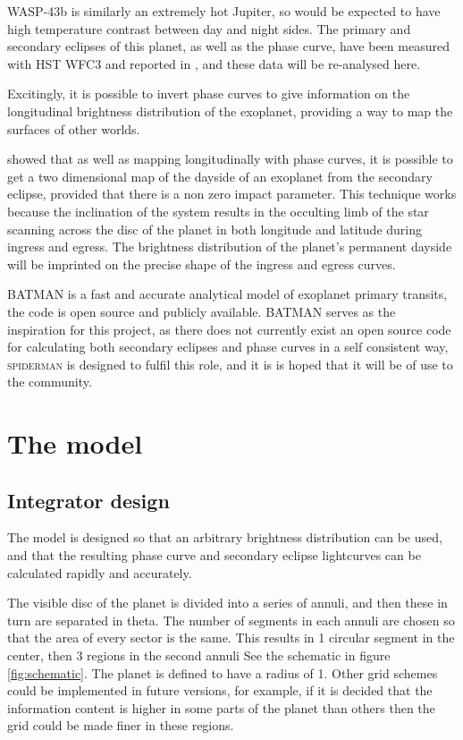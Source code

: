 \documentclass[a4paper,fleqn,usenatbib]{mnras}
\begin{document}
WASP-43b is similarly an extremely hot Jupiter, so would be expected to have high temperature contrast between day and night sides. The primary and secondary eclipses of this planet, as well as the phase curve, have been measured with HST WFC3 and reported in \citep{Stevenson2014}, and these data will be re-analysed here.

Excitingly, it is possible to invert phase curves to give information on the longitudinal brightness distribution of the exoplanet, providing a way to map the surfaces of other worlds. 

\cite{Majeau2012} showed that as well as mapping longitudinally with phase curves, it is possible to get a two dimensional map of the dayside of an exoplanet from the secondary eclipse, provided that there is a non zero impact parameter. This technique works because the inclination of the system results in the occulting limb of the star scanning across the disc of the planet in both longitude and latitude during ingress and egress. The brightness distribution of the planet's permanent dayside will be imprinted on the precise shape of the ingress and egress curves.

BATMAN \citep{Kreidberg2015a} is a fast and accurate analytical model of exoplanet primary transits, the code is open source and publicly available. BATMAN serves as the inspiration for this project, as there does not currently exist an open source code for calculating both secondary eclipses and phase curves in a self consistent way, \textsc{spiderman} is designed to fulfil this role, and it is is hoped that it will be of use to the community.

\section{The model}\label{sec:the model}

\subsection{Integrator design}\label{sec:integrator}

The model is designed so that an arbitrary brightness distribution can be used, and that the resulting phase curve and secondary eclipse lightcurves can be calculated rapidly and accurately. 

The visible disc of the planet is divided into a series of annuli, and then these in turn are separated in theta. The number of segments in each annuli are chosen so that the area of every sector is the same. This results in 1 circular segment in the center, then 3 regions in the second annuli See the schematic in figure \ref{fig:schematic}. The planet is defined to have a radius of 1. Other grid schemes could be implemented in future versions, for example, if it is decided that the information content is higher in some parts of the planet than others then the grid could be made finer in these regions.
\end{document}
